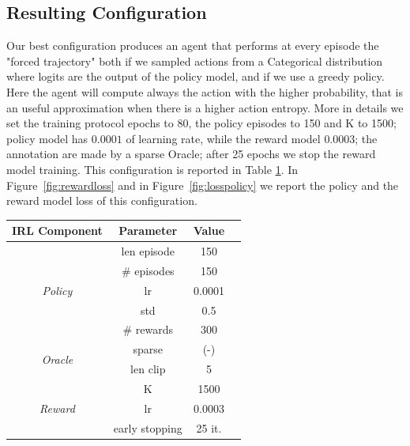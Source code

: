 \subsection{Resulting Configuration}

Our best configuration produces an agent that performs at every episode the "forced trajectory" both if we sampled actions from a Categorical distribution where logits are the output of the policy model, and if we use a greedy policy. Here the agent will compute always the action with the higher probability, that is an useful approximation when there is a higher action entropy. More in details we set the training protocol epochs to 80, the policy episodes to 150 and K to 1500; policy model has $0.0001$ of learning rate, while the reward model $0.0003$; the annotation are made by a sparse Oracle; after 25 epochs we stop the reward model training. This configuration is reported in Table \ref{table:config}. In Figure\ \ref{fig:rewardloss} and in Figure\ \ref{fig:losspolicy} we report the policy and the reward model loss of this configuration.

\begin{table}[h!]
    \centering
    \begin{tabular}{ |c|c|c|c| } 
        \hline
        \textbf{IRL Component} & \textbf{Parameter} & \textbf{Value} \\
          \hline
          \multirow{5}{*}{\textit{Policy}} & len episode & 150 \\ 
          & \# episodes & 150 \\ 
          & lr  & 0.0001 \\ 
          & std  & 0.5 \\
          & \# rewards & 300 \\
          \hline
          \multirow{2}{*}{\textit{Oracle}} & sparse & (-) \\ 
          & len clip & 5 \\
          \hline
          \multirow{3}{*}{\textit{Reward}} & K & 1500 \\ 
          & lr & 0.0003 \\ 
          & early stopping & 25 it. \\ 
          \hline
    \end{tabular}
    \label{table:config}
\end{table}

